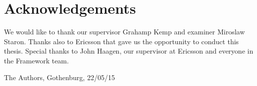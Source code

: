 \thispagestyle{plain}			%
\section*{Acknowledgements}
We would like to thank our supervisor Grahamp Kemp and examiner Miroslaw Staron. Thanks also to Ericsson that gave us the opportunity to conduct this thesis. Special thanks to John Haagen, our supervisor at Ericsson and everyone in the Framework team.

\vspace{1.5cm}
\hfill
The Authors, Gothenburg, 22/05/15

\newpage				%
\thispagestyle{empty}
\mbox{}